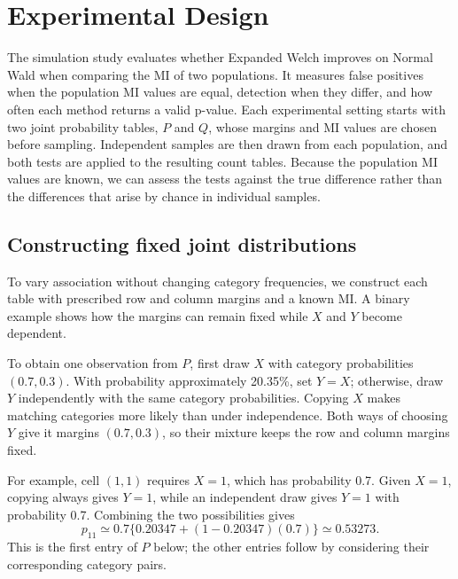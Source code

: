 \chapter{Experimental Design}
\label{chap:design}

The simulation study evaluates whether Expanded Welch improves on Normal
Wald when comparing the MI of two populations. It measures false positives
when the population MI values are equal, detection when they differ, and how
often each method returns a valid p-value.
Each experimental setting starts with two joint probability tables,
\(P\) and \(Q\), whose margins and MI values are chosen before sampling.
Independent samples are then drawn from each population, and both tests are
applied to the resulting count tables. Because the population MI values are
known, we can assess the tests against the true difference rather than the
differences that arise by chance in individual samples.

\section{Constructing fixed joint distributions}

To vary association without changing category frequencies, we construct
each table with prescribed row and column margins and a known MI\@. A binary
example shows how the margins can remain fixed while \(X\) and \(Y\)
become dependent.

\medskip
{}

To obtain one observation from \(P\), first draw \(X\) with category
probabilities \((0.7,0.3)\). With probability approximately 20.35\%, set
\(Y=X\); otherwise, draw \(Y\) independently with the same category
probabilities. Copying \(X\) makes matching categories more likely than
under independence. Both ways of choosing \(Y\) give it margins
\((0.7,0.3)\), so their mixture keeps the row and column margins fixed.

\begin{samepage}
For example, cell \((1,1)\) requires \(X=1\), which has probability 0.7.
Given \(X=1\), copying always gives \(Y=1\), while an independent draw
gives \(Y=1\) with probability 0.7. Combining the two possibilities gives
\begin{equation*}
 p_{11}\simeq0.7\{0.20347+(1-0.20347)(0.7)\}
 \simeq0.53273.
\end{equation*}
This is the first entry of \(P\) below; the other entries follow by
considering their corresponding category pairs.
\par
\end{samepage}

